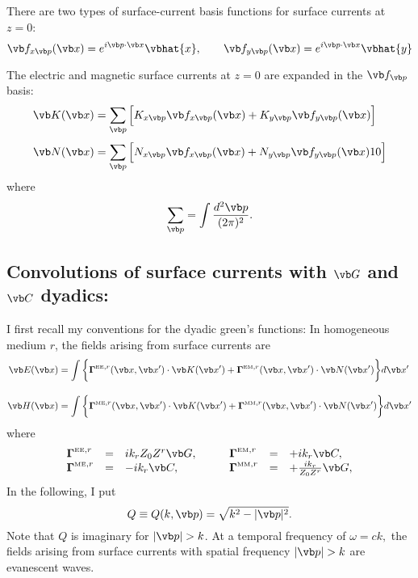 \documentclass{article}
\newcommand{\BG}{\boldsymbol{\Gamma}}
\begin{document}
There are two types of surface-current basis functions 
for surface currents at $z=0$:
$$ \vb f_{x\vb p}(\vb x) = e^{i\vb p \cdot \vb x} \vbhat{x}, \qquad
   \vb f_{y\vb p}(\vb x) = e^{i\vb p \cdot \vb x} \vbhat{y}
$$

The electric and magnetic surface currents at $z=0$ are 
expanded in the $\vb f_{\vb p}$ basis:
\begin{align*}
  \vb K(\vb x) 
&= \sum_{\vb p}
   \Big[   K_{x\vb p} \vb f_{x\vb p}(\vb x)  
         + K_{y\vb p} \vb f_{y\vb p}(\vb x)  
   \Big]
\\[3pt]
  \vb N(\vb x) 
&= \sum_{\vb p}
   \Big[   N_{x\vb p} \vb f_{x\vb p}(\vb x)  
         + N_{y\vb p} \vb f_{y\vb p}(\vb x)  10
   \Big]
\end{align*}
where  
$$ \sum_{\vb p} = \int\frac{d^2 \vb p}{(2\pi)^2}. $$

\subsection{Convolutions of surface currents with $\vb G$ and $\vb C$ dyadics:}

I first recall my conventions for the dyadic green's functions: In homogeneous
medium $r$, the fields arising from surface currents are
\begin{align*}
    \vb E(\vb x) 
&= \int\bigg\{ 
   \BG^{\text{\tiny{EE}},r}(\vb x, \vb x^\prime) 
   \cdot 
   \vb K(\vb x^\prime) 
  +\BG^{\text{\tiny{EM}},r}(\vb x, \vb x^\prime) 
   \cdot 
   \vb N(\vb x^\prime) \bigg\} d\vb x^\prime
\\[10pt]
    \vb H(\vb x) 
&= \int\bigg\{ 
   \BG^{\text{\tiny{ME}},r}(\vb x, \vb x^\prime) 
   \cdot 
   \vb K(\vb x^\prime) 
  +\BG^{\text{\tiny{MM}},r}(\vb x, \vb x^\prime) 
   \cdot 
   \vb N(\vb x^\prime) \bigg\} d\vb x^\prime
\end{align*}
where 
$$\begin{array}{lcllcl}
 \BG^{\text{\tiny{EE}},r}
 &=&ik_r Z_0 Z^r \vb G, 
 \qquad 
 &\BG^{\text{\tiny{EM}},r}
 &=&+ik_r \vb C, 
\\
 \BG^{\text{\tiny{ME}},r}
 &=&-ik_r \vb C, 
 \qquad 
 &\BG^{\text{\tiny{MM}},r}
 &=&+\frac{ik_r}{Z_0Z^r} \vb G, 
\\
\end{array}$$
In the following, I put 
$$ Q \equiv Q(k,\vb p) = \sqrt{k^2 - |\vb p|^2}.$$
Note that $Q$ is imaginary for $|\vb p|>k$. At a temporal
frequency of $\omega=ck,$ the fields arising from surface 
currents with spatial frequency $|\vb p|>k$ are evanescent 
waves.
\end{document}
